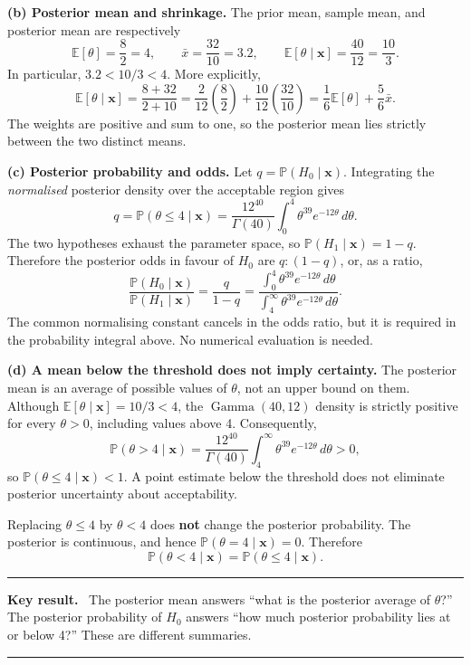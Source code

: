 \documentclass[11pt,a4paper]{article}
\newcommand{\given}{\mathrel{|}}
\newcommand{\xvec}{\boldsymbol{x}}
\newcommand{\E}{\mathbb{E}}
\newenvironment{keyresult}
  {\begin{center}\begin{minipage}{0.92\linewidth}\color{statblue}%
   \hrule\vspace{6pt}\textbf{Key result.}\ }
  {\vspace{6pt}\hrule\end{minipage}\end{center}}
\begin{document}
\textbf{(b) Posterior mean and shrinkage.}
The prior mean, sample mean, and posterior mean are respectively
\[
\E[\theta]=\frac82=4,\qquad
\bar x=\frac{32}{10}=3.2,\qquad
\boxed{\E[\theta\given\xvec]=\frac{40}{12}=\frac{10}{3}.}
\]
In particular, $3.2<10/3<4$. More explicitly,
\[
\E[\theta\given\xvec]
=\frac{8+32}{2+10}
=\frac{2}{12}\left(\frac82\right)
 +\frac{10}{12}\left(\frac{32}{10}\right)
=\frac16\E[\theta]+\frac56\bar x.
\]
The weights are positive and sum to one, so the posterior mean lies
strictly between the two distinct means.

\textbf{(c) Posterior probability and odds.}
Let $q=\mathbb P(H_0\given\xvec)$. Integrating the \emph{normalised}
posterior density over the acceptable region gives
\[
\boxed{q=\mathbb P(\theta\le4\given\xvec)
=\frac{12^{40}}{\Gamma(40)}
\int_0^4\theta^{39}e^{-12\theta}\,d\theta.}
\]
The two hypotheses exhaust the parameter space, so
$\mathbb P(H_1\given\xvec)=1-q$. Therefore the posterior odds in favour
of $H_0$ are $q:(1-q)$, or, as a ratio,
\[
\boxed{
\frac{\mathbb P(H_0\given\xvec)}{\mathbb P(H_1\given\xvec)}
=\frac{q}{1-q}
=\frac{\displaystyle\int_0^4\theta^{39}e^{-12\theta}\,d\theta}
       {\displaystyle\int_4^\infty\theta^{39}e^{-12\theta}\,d\theta}.
}
\]
The common normalising constant cancels in the odds ratio, but it is
required in the probability integral above. No numerical evaluation is
needed.

\textbf{(d) A mean below the threshold does not imply certainty.}
The posterior mean is an average of possible values of $\theta$, not an
upper bound on them. Although $\E[\theta\given\xvec]=10/3<4$, the
$\operatorname{Gamma}(40,12)$ density is strictly positive for every
$\theta>0$, including values above 4. Consequently,
\[
\mathbb P(\theta>4\given\xvec)
=\frac{12^{40}}{\Gamma(40)}
\int_4^\infty\theta^{39}e^{-12\theta}\,d\theta>0,
\]
so $\mathbb P(\theta\le4\given\xvec)<1$. A point estimate below the
threshold does not eliminate posterior uncertainty about acceptability.

Replacing $\theta\le4$ by $\theta<4$ does \textbf{not} change the
posterior probability. The posterior is continuous, and hence
$\mathbb P(\theta=4\given\xvec)=0$. Therefore
\[
\boxed{\mathbb P(\theta<4\given\xvec)
=\mathbb P(\theta\le4\given\xvec).}
\]

\begin{keyresult}
The posterior mean answers ``what is the posterior average of
$\theta$?'' The posterior probability of $H_0$ answers ``how much
posterior probability lies at or below 4?'' These are different summaries.
\end{keyresult}
\end{document}
